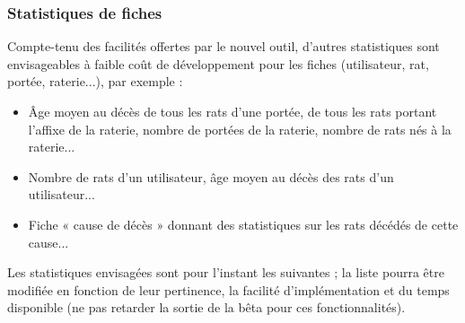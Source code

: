 ﻿\documentclass[a4paper,10pt]{article}
\begin{document}
\subsubsection{Statistiques de fiches}

Compte-tenu des facilités offertes par le nouvel outil, d'autres statistiques sont envisageables à faible coût de développement pour les fiches (utilisateur, rat, portée, raterie...), par exemple :
\begin{itemize}
\item Âge moyen au décès de tous les rats d'une portée, de tous les rats portant l'affixe de la raterie, nombre de portées de la raterie, nombre de rats nés à la raterie...
\item Nombre de rats d'un utilisateur, âge moyen au décès des rats d'un utilisateur...
\item Fiche « cause de décès » donnant des statistiques sur les rats décédés de cette cause...  
\end{itemize}

Les statistiques envisagées sont pour l'instant les suivantes ; la liste pourra être modifiée en fonction de leur pertinence, la facilité d'implémentation et du temps disponible (ne pas retarder la sortie de la bêta pour ces fonctionnalités).
\end{document}
